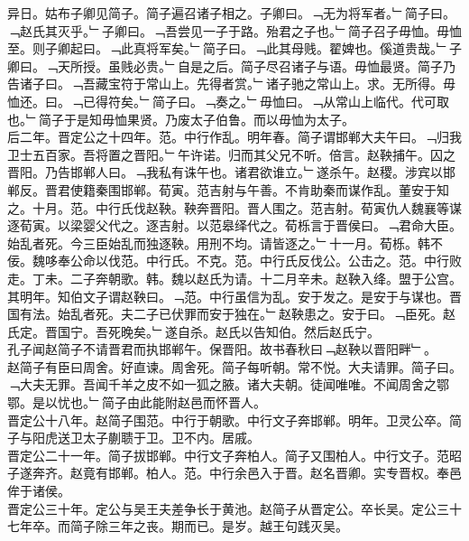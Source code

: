 \documentclass{zhvt-classic}
\begin{document}
\hspace*{2em}异日。姑布子卿见简子。简子遍召诸子相之。子卿曰。﹁无为将军者。﹂简子曰。﹁赵氏其灭乎。﹂子卿曰。﹁吾尝见一子于路。殆君之子也。﹂简子召子毋恤。毋恤至。则子卿起曰。﹁此真将军矣。﹂简子曰。﹁此其母贱。翟婢也。傒道贵哉。﹂子卿曰。﹁天所授。虽贱必贵。﹂自是之后。简子尽召诸子与语。毋恤最贤。简子乃告诸子曰。﹁吾藏宝符于常山上。先得者赏。﹂诸子驰之常山上。求。无所得。毋恤还。曰。﹁已得符矣。﹂简子曰。﹁奏之。﹂毋恤曰。﹁从常山上临代。代可取也。﹂简子于是知毋恤果贤。乃废太子伯鲁。而以毋恤为太子。\\
\hspace*{2em}后二年。晋定公之十四年。范。中行作乱。明年春。简子谓邯郸大夫午曰。﹁归我卫士五百家。吾将置之晋阳。﹂午许诺。归而其父兄不听。倍言。赵鞅捕午。囚之晋阳。乃告邯郸人曰。﹁我私有诛午也。诸君欲谁立。﹂遂杀午。赵稷。涉宾以邯郸反。晋君使籍秦围邯郸。荀寅。范吉射与午善。不肯助秦而谋作乱。董安于知之。十月。范。中行氏伐赵鞅。鞅奔晋阳。晋人围之。范吉射。荀寅仇人魏襄等谋逐荀寅。以梁婴父代之。逐吉射。以范皋绎代之。荀栎言于晋侯曰。﹁君命大臣。始乱者死。今三臣始乱而独逐鞅。用刑不均。请皆逐之。﹂十一月。荀栎。韩不佞。魏哆奉公命以伐范。中行氏。不克。范。中行氏反伐公。公击之。范。中行败走。丁未。二子奔朝歌。韩。魏以赵氏为请。十二月辛未。赵鞅入绛。盟于公宫。其明年。知伯文子谓赵鞅曰。﹁范。中行虽信为乱。安于发之。是安于与谋也。晋国有法。始乱者死。夫二子已伏罪而安于独在。﹂赵鞅患之。安于曰。﹁臣死。赵氏定。晋国宁。吾死晚矣。﹂遂自杀。赵氏以告知伯。然后赵氏宁。\\
\hspace*{2em}孔子闻赵简子不请晋君而执邯郸午。保晋阳。故书春秋曰﹁赵鞅以晋阳畔﹂。\\
\hspace*{2em}赵简子有臣曰周舍。好直谏。周舍死。简子每听朝。常不悦。大夫请罪。简子曰。﹁大夫无罪。吾闻千羊之皮不如一狐之腋。诸大夫朝。徒闻唯唯。不闻周舍之鄂鄂。是以忧也。﹂简子由此能附赵邑而怀晋人。\\
\hspace*{2em}晋定公十八年。赵简子围范。中行于朝歌。中行文子奔邯郸。明年。卫灵公卒。简子与阳虎送卫太子蒯聩于卫。卫不内。居戚。\\
\hspace*{2em}晋定公二十一年。简子拔邯郸。中行文子奔柏人。简子又围柏人。中行文子。范昭子遂奔齐。赵竟有邯郸。柏人。范。中行余邑入于晋。赵名晋卿。实专晋权。奉邑侔于诸侯。\\
\hspace*{2em}晋定公三十年。定公与吴王夫差争长于黄池。赵简子从晋定公。卒长吴。定公三十七年卒。而简子除三年之丧。期而已。是岁。越王句践灭吴。\\
\end{document}
